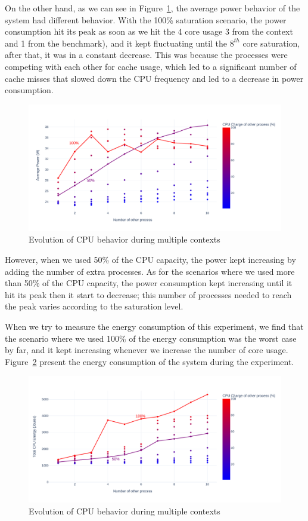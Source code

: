On the other hand, as we can see in Figure~\ref{fig:green_faas_power}, the average power behavior of the system had different behavior.
With the 100\% saturation scenario, the power consumption hit its peak as soon as we hit the 4 core usage 3 from the context and 1 from the benchmark), and it kept fluctuating until the $8^{th}$ core saturation, after that, it was in a constant decrease.
This was because the processes were competing with each other for cache usage, which led to a significant number of cache misses that slowed down the CPU frequency and led to a decrease in power consumption.

\begin{figure}[!h]
    \centering
    \includegraphics[width=\linewidth]{chapters/green_faas_power}
    \caption{Evolution of CPU behavior during multiple contexts }
    \label{fig:green_faas_power}
\end{figure}


However, when we used 50\% of the CPU capacity, the power kept increasing by adding the number of extra processes.
As for the scenarios where we used more than 50\% of the CPU capacity, the power consumption kept increasing until it hit its peak then it start to decrease; this number of processes needed to reach the peak varies according to the saturation level.

When we try to measure the energy consumption of this experiment, we find that the scenario where we used 100\% of the energy consumption was the worst case by far, and it kept increasing whenever we increase the number of core usage.
Figure~\ref{fig:green_faas_energy} present the energy consumption of the system during the experiment.

\begin{figure}[!h]
    \centering
    \caption{Evolution of CPU behavior during multiple contexts }
    \label{fig:green_faas_energy}
    \includegraphics[width=\linewidth]{chapters/green_faas_energy}
\end{figure}

